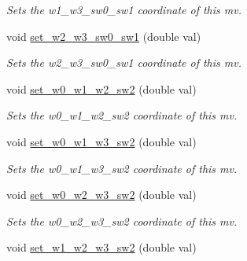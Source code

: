 \begin{DoxyCompactItemize}
\begin{DoxyCompactList}\small\item\em Sets the w1\-\_\-w3\-\_\-sw0\-\_\-sw1 coordinate of this mv. \end{DoxyCompactList}\item 
\hypertarget{classe3ga_1_1mv_a6079f7f0a5f3072970f70feb66578c51}{void \hyperlink{classe3ga_1_1mv_a6079f7f0a5f3072970f70feb66578c51}{set\-\_\-w2\-\_\-w3\-\_\-sw0\-\_\-sw1} (double val)}\label{classe3ga_1_1mv_a6079f7f0a5f3072970f70feb66578c51}

\begin{DoxyCompactList}\small\item\em Sets the w2\-\_\-w3\-\_\-sw0\-\_\-sw1 coordinate of this mv. \end{DoxyCompactList}\item 
\hypertarget{classe3ga_1_1mv_ab15f75c82eef351d13badd61db55be45}{void \hyperlink{classe3ga_1_1mv_ab15f75c82eef351d13badd61db55be45}{set\-\_\-w0\-\_\-w1\-\_\-w2\-\_\-sw2} (double val)}\label{classe3ga_1_1mv_ab15f75c82eef351d13badd61db55be45}

\begin{DoxyCompactList}\small\item\em Sets the w0\-\_\-w1\-\_\-w2\-\_\-sw2 coordinate of this mv. \end{DoxyCompactList}\item 
\hypertarget{classe3ga_1_1mv_a7b815be72b3ec2c56fe5bef211b4b75c}{void \hyperlink{classe3ga_1_1mv_a7b815be72b3ec2c56fe5bef211b4b75c}{set\-\_\-w0\-\_\-w1\-\_\-w3\-\_\-sw2} (double val)}\label{classe3ga_1_1mv_a7b815be72b3ec2c56fe5bef211b4b75c}

\begin{DoxyCompactList}\small\item\em Sets the w0\-\_\-w1\-\_\-w3\-\_\-sw2 coordinate of this mv. \end{DoxyCompactList}\item 
\hypertarget{classe3ga_1_1mv_a9827b47626a855cec3b6e5eeea882f6d}{void \hyperlink{classe3ga_1_1mv_a9827b47626a855cec3b6e5eeea882f6d}{set\-\_\-w0\-\_\-w2\-\_\-w3\-\_\-sw2} (double val)}\label{classe3ga_1_1mv_a9827b47626a855cec3b6e5eeea882f6d}

\begin{DoxyCompactList}\small\item\em Sets the w0\-\_\-w2\-\_\-w3\-\_\-sw2 coordinate of this mv. \end{DoxyCompactList}\item 
\hypertarget{classe3ga_1_1mv_aa05d843885547bc2b9d3caa967dd2478}{void \hyperlink{classe3ga_1_1mv_aa05d843885547bc2b9d3caa967dd2478}{set\-\_\-w1\-\_\-w2\-\_\-w3\-\_\-sw2} (double val)}\label{classe3ga_1_1mv_aa05d843885547bc2b9d3caa967dd2478}


\end{DoxyCompactItemize}
